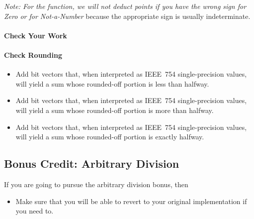 \textit{Note: For the  function, we will not deduct points if you have the wrong sign for Zero or for Not-a-Number} because the appropriate sign is usually indeterminate.

\paragraph*{Check Your Work}

\begin{description}
\end{description}

\paragraph*{Check Rounding}

\begin{description}
    \begin{itemize}
        \item Add bit vectors that, when interpreted as IEEE~754 single-precision values, will yield a sum whose rounded-off portion is less than halfway.
        \item Add bit vectors that, when interpreted as IEEE~754 single-precision values, will yield a sum whose rounded-off portion is more than halfway.
        \item Add bit vectors that, when interpreted as IEEE~754 single-precision values, will yield a sum whose rounded-off portion is exactly halfway.
    \end{itemize}
\end{description}



\subsection{Bonus Credit: Arbitrary Division} \label{subsec:tldrBonus}

If you are going to pursue the arbitrary division bonus, then
\begin{description}
    \checkoffitem{\textcolor{red}{Be sure that you have a backup copy of your work!}}
    \begin{itemize}
        \item Make sure that you will be able to revert to your original  implementation if you need to.
    \end{itemize}
\end{description}